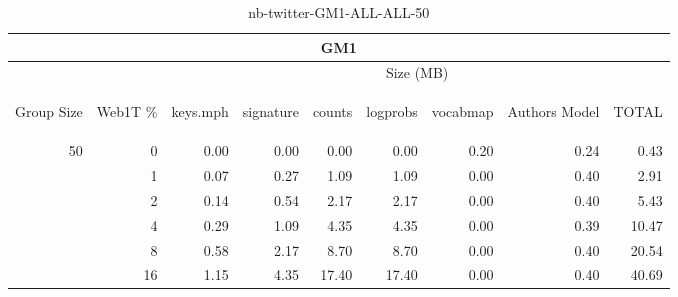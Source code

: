 \begin{center}
\begin{table}[htbp] 
 \begin{center}
\begin{tabular}{ | r | r | r | r | r | r | r | r | r |}
\hline
\multicolumn{9}{|c|}{GM1}\\
\hline
 & & \multicolumn{7}{|c|}{Size (MB)}\\ \cline{3-9}
\begin{sideways}Group Size\end{sideways} & \begin{sideways}Web1T \% \end{sideways} & \begin{sideways}keys.mph\end{sideways} & \begin{sideways}signature\end{sideways} & \begin{sideways}counts\end{sideways} & \begin{sideways}logprobs\end{sideways} & \begin{sideways}vocabmap\end{sideways} & \begin{sideways}Authors Model \end{sideways} & \begin{sideways}TOTAL\end{sideways}\\
\hline
\multirow{5}{*}{50}
 & 0 & 0.00 & 0.00 & 0.00 & 0.00 & 0.20 & 0.24 & 0.43\\ \cline{2-9}
 & 1 & 0.07 & 0.27 & 1.09 & 1.09 & 0.00 & 0.40 & 2.91\\ \cline{2-9}
 & 2 & 0.14 & 0.54 & 2.17 & 2.17 & 0.00 & 0.40 & 5.43\\ \cline{2-9}
 & 4 & 0.29 & 1.09 & 4.35 & 4.35 & 0.00 & 0.39 & 10.47\\ \cline{2-9}
 & 8 & 0.58 & 2.17 & 8.70 & 8.70 & 0.00 & 0.40 & 20.54\\ \cline{2-9}
 & 16 & 1.15 & 4.35 & 17.40 & 17.40 & 0.00 & 0.40 & 40.69\\ \cline{2-9}
\hline
\end{tabular}
\caption{nb-twitter-GM1-ALL-ALL-50}
\label{table:nb-twitter-GM1-ALL-ALL-50}
\end{center}
 \end{table}
\end{center}

